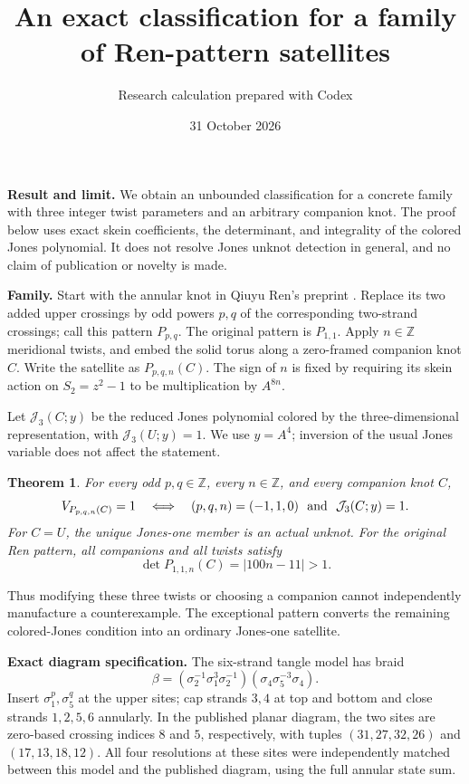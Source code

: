 \documentclass[11pt]{article}
\title{An exact classification for a family of Ren-pattern satellites}
\author{Research calculation prepared with Codex}
\date{31 October 2026}
\newtheorem{theorem}{Theorem}
\newcommand{\Z}{\mathbb Z}
\newcommand{\J}{\mathcal J}
\begin{document}
\maketitle
\textbf{Result and limit.}
We obtain an unbounded classification for a concrete family with three integer twist parameters and an arbitrary companion knot. The proof below uses exact skein coefficients, the determinant, and integrality of the colored Jones polynomial. It does not resolve Jones unknot detection in general, and no claim of publication or novelty is made.

\textbf{Family.}
Start with the annular knot in Qiuyu Ren's preprint \cite{Ren}. Replace its two added upper crossings by odd powers $p,q$ of the corresponding two-strand crossings; call this pattern $P_{p,q}$. The original pattern is $P_{1,1}$. Apply $n\in\Z$ meridional twists, and embed the solid torus along a zero-framed companion knot $C$. Write the satellite as $P_{p,q,n}(C)$. The sign of $n$ is fixed by requiring its skein action on $S_2=z^2-1$ to be multiplication by $A^{8n}$.

Let $\J_3(C;y)$ be the reduced Jones polynomial colored by the three-dimensional representation, with $\J_3(U;y)=1$. We use $y=A^4$; inversion of the usual Jones variable does not affect the statement.

\begin{theorem}\label{main}
For every odd $p,q\in\Z$, every $n\in\Z$, and every companion knot $C$,
\[
 V_{P_{p,q,n}(C)}=1
 \quad\Longleftrightarrow\quad
 (p,q,n)=(-1,1,0)\ \hbox{ and }\ \J_3(C;y)=1.
\]
For $C=U$, the unique Jones-one member is an actual unknot.
For the original Ren pattern, all companions and all twists satisfy
\[
 \det P_{1,1,n}(C)=|100n-11|>1.
\]
\end{theorem}

Thus modifying these three twists or choosing a companion cannot independently manufacture a counterexample. The exceptional pattern converts the remaining colored-Jones condition into an ordinary Jones-one satellite.

\textbf{Exact diagram specification.}
The six-strand tangle model has braid
\[
 \beta=(\sigma_2^{-1}\sigma_1^3\sigma_2^{-1})
       (\sigma_4\sigma_5^{-3}\sigma_4).
\]
Insert $\sigma_1^p,\sigma_5^q$ at the upper sites; cap strands $3,4$ at top and bottom and close strands $1,2,5,6$ annularly. In the published planar diagram, the two sites are zero-based crossing indices $8$ and $5$, respectively, with tuples $(31,27,32,26)$ and $(17,13,18,12)$. All four resolutions at these sites were independently matched between this model and the published diagram, using the full annular state sum.
\end{document}

